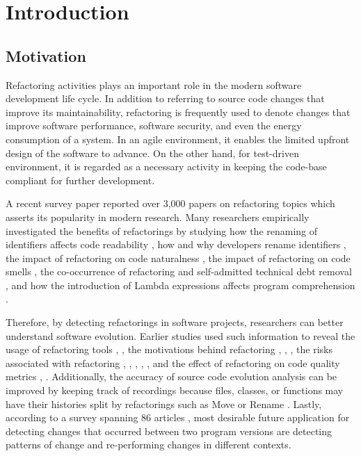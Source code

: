 \documentclass[letterpaper,12pt,onecolumn,final]{report}
\begin{document}
\chapter{Introduction}
\section{Motivation}

Refactoring activities plays an important role in the modern software development life cycle. In addition to referring to source code changes that improve its maintainability, refactoring is frequently used to denote changes that improve software performance, software security, and even the energy consumption of a system. In an agile environment, it enables the limited upfront design of the software to advance. On the other hand, for test-driven environment, it is regarded as a necessary activity in keeping the code-base compliant for further development. 

A recent survey paper \cite{abid202030} reported over 3,000 papers on refactoring topics which asserts its popularity in modern research. Many researchers empirically investigated the benefits of refactorings by studying how the renaming of identifiers affects code readability \cite{fakhoury2019improving}, how and why developers rename identifiers \cite{peruma2018empirical}, the impact of refactoring on code naturalness \cite{lin2019impact}, the impact of refactoring on code smells \cite{cedrim2017understanding}, the co-occurrence of refactoring and self-admitted technical debt removal \cite{iammarino2019self}, and how the introduction of Lambda expressions affects program comprehension \cite{lucas2019does}.

Therefore, by detecting refactorings in software projects, researchers can better understand software evolution. Earlier studies used such information to reveal the usage of refactoring tools  \cite{MurphyHill2012}, \cite{Negara2013}, the motivations behind refactoring \cite{kim2012field}, \cite{kim2014empirical}, \cite{Silva2016}, the risks associated with refactoring \cite{kim2012field}, \cite{kim2014empirical}, \cite{kim2011empirical}, \cite{weissgerber2006refactorings}, \cite{bavota2012does}, and the effect of refactoring on code quality metrics \cite{kim2012field}, \cite{kim2014empirical}. Additionally, the accuracy of source code evolution analysis can be improved by keeping track of recordings because files, classes, or functions may have their histories split by refactorings such as Move or Rename \cite{hora2018assessing}. Lastly, according to a survey spanning 86 articles \cite{soetens2017changes}, most desirable future application for detecting changes that occurred between two program versions are detecting patterns of change and re-performing changes in different contexts.
\end{document}
